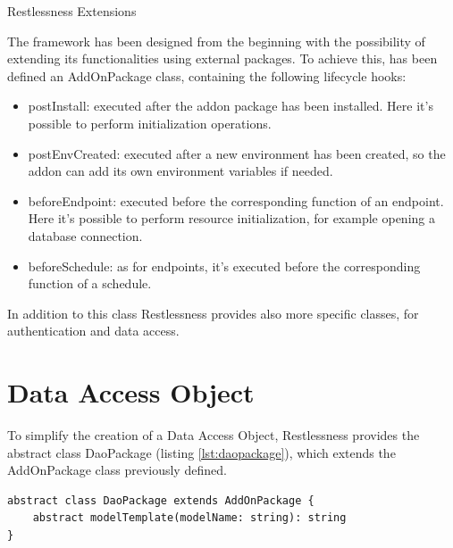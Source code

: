 \begin{chapter}{Restlessness Extensions}
    \label{chap:extensions}

    The framework has been designed from the beginning with the possibility of
    extending its functionalities using external packages.
    To achieve this, has been defined an AddOnPackage class, containing the
    following lifecycle hooks:
    \begin{itemize}
        \item postInstall: executed after the addon package has been installed.
            Here it's possible to perform initialization operations.
        \item postEnvCreated: executed after a new environment has been created,
            so the addon can add its own environment variables if needed.
        \item beforeEndpoint: executed before the corresponding function of an
            endpoint. Here it's possible to perform resource initialization,
            for example opening a database connection.
        \item beforeSchedule: as for endpoints, it's executed before the
            corresponding function of a schedule.
    \end{itemize}

    In addition to this class Restlessness provides also more specific classes,
    for authentication and data access.



    \section{Data Access Object}
    \label{sec:data_access_object}

    To simplify the creation of a Data Access Object, Restlessness provides the
    abstract class DaoPackage (listing \ref{lst:daopackage}), which extends the
    AddOnPackage class previously defined.

    \begin{lstlisting}[caption=DaoPackage class definition, label={lst:daopackage}]
abstract class DaoPackage extends AddOnPackage {
    abstract modelTemplate(modelName: string): string
}
    \end{lstlisting}


\end{chapter}
